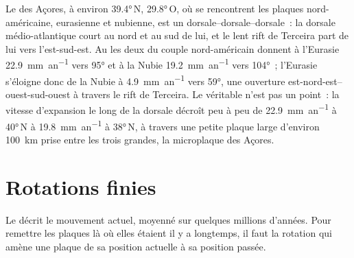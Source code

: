 \begin{omfigure}
\par{}
\label{fig:b1:plate-kinematics:rrr}
\end{omfigure}

Le  des Açores, à environ \ang{39.4}\,N, \ang{29.8}\,O, où se rencontrent les
plaques nord-américaine, eurasienne et nubienne, est un 
dorsale--dorsale--dorsale~: la dorsale médio-atlantique court au nord et au sud de lui, et le
lent rift de Terceira part de lui vers l'est-sud-est. Au  les deux 
du couple nord-américain donnent à l'Eurasie \qty{22.9}{mm.an^{-1}} vers
\ang{95} et à la Nubie \qty{19.2}{mm.an^{-1}} vers \ang{104}~; l'Eurasie
s'éloigne donc de la Nubie à \qty{4.9}{mm.an^{-1}} vers \ang{59}, une
ouverture est-nord-est--ouest-sud-ouest à travers le rift de Terceira. Le véritable
 n'est pas un point~: la vitesse d'expansion le long de la dorsale décroît peu à peu
de \qty{22.9}{mm.an^{-1}} à \ang{40}\,N à \qty{19.8}{mm.an^{-1}} à
\ang{38}\,N, à travers une petite plaque large d'environ \qty{100}{km} prise entre les
trois grandes, la microplaque des Açores.

\section{Rotations finies}

Le  décrit le mouvement actuel, moyenné sur quelques millions d'années.
Pour remettre les plaques là où elles étaient il y a longtemps, il faut la rotation
qui amène une plaque de sa position actuelle à sa position passée.

